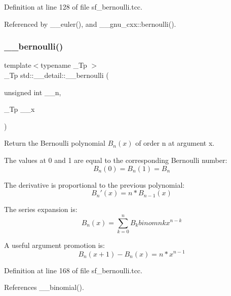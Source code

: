 Definition at line 128 of file sf\+\_\+bernoulli.\+tcc.



Referenced by \+\_\+\+\_\+euler(), and \+\_\+\+\_\+gnu\+\_\+cxx\+::bernoulli().

\mbox{\label{namespacestd_1_1____detail_a1171e65b7fb7712f0181fe7288acb343}} 
\subsubsection{\texorpdfstring{\+\_\+\+\_\+bernoulli()}{\_\_bernoulli()}\hspace{0.1cm}{\footnotesize\ttfamily [2/2]}}
{\footnotesize\ttfamily template$<$typename \+\_\+\+Tp $>$ \\
\+\_\+\+Tp std\+::\+\_\+\+\_\+detail\+::\+\_\+\+\_\+bernoulli (\begin{DoxyParamCaption}\item[{unsigned int}]{\+\_\+\+\_\+n,  }\item[{\+\_\+\+Tp}]{\+\_\+\+\_\+x }\end{DoxyParamCaption})}

Return the Bernoulli polynomial $ B_n(x) $ of order n at argument x.

The values at 0 and 1 are equal to the corresponding Bernoulli number\+: \[ B_n(0) = B_n(1) = B_n \]

The derivative is proportional to the previous polynomial\+: \[ B_n'(x) = n * B_{n-1}(x) \]

The series expansion is\+: \[ B_n(x) = \sum_{k=0}^{n} B_k binom{n}{k} x^{n-k} \]

A useful argument promotion is\+: \[ B_n(x+1) - B_n(x) = n * x^{n-1} \] 

Definition at line 168 of file sf\+\_\+bernoulli.\+tcc.



References \+\_\+\+\_\+binomial().

\mbox{\label{namespacestd_1_1____detail_abd0b1f05f2b32a21cad034b38473bb8b}} 
